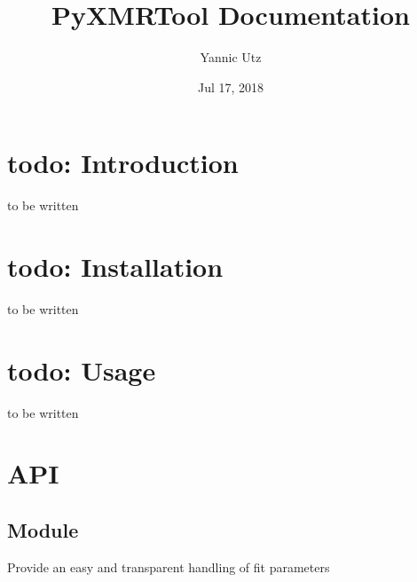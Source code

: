 \documentclass[letterpaper,10pt,english]{sphinxmanual}
\title{PyXMRTool Documentation}
\date{Jul 17, 2018}
\author{Yannic Utz}
\begin{document}
\maketitle
\sphinxtableofcontents
{}\label{\detokenize{index::doc}}



\chapter{todo: Introduction}
\label{\detokenize{intro:todo-introduction}}\label{\detokenize{intro::doc}}
to be written


\chapter{todo: Installation}
\label{\detokenize{install:todo-installation}}\label{\detokenize{install::doc}}
to be written


\chapter{todo: Usage}
\label{\detokenize{usage:todo-usage}}\label{\detokenize{usage::doc}}
to be written


\chapter{API}
\label{\detokenize{api:api}}\label{\detokenize{api::doc}}

\section{Module }
\label{\detokenize{modules-api/parameters:module-Parameters}}\label{\detokenize{modules-api/parameters:module-parameters}}\label{\detokenize{modules-api/parameters::doc}}
Provide an easy and transparent handling of fit parameters
\end{document}

